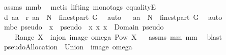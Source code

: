 \begin{isabellebody}
\ assms\ mm{}{}b\ \isamarkupfalse%
\ {\isacharparenleft}metis\ {\isacharparenleft}lifting{\isacharcomma}\ mono{\isacharunderscore}tags{\isacharparenright}\ equalityE{\isacharparenright}\isanewline
{}\isamarkupfalse%
\ \isamarkupfalse%
\ {\isachardoublequoteopen}{\isacharquery}d\ {\isacharquery}aa\ {\isasymtimes}\ {\isacharparenleft}{\isacharquery}r\ {\isacharquery}aa{\isacharparenright}\ {\isasymsubseteq}\ N\ {\isasymtimes}\ finestpart\ G{\isachardoublequoteclose}\ \isamarkupfalse%
\ auto\isanewline
{}\isamarkupfalse%
\ \isamarkupfalse%
\ {\isachardoublequoteopen}{\isacharquery}aa\ {\isasymsubseteq}\ N\ {\isasymtimes}\ finestpart\ G{\isachardoublequoteclose}\ \isamarkupfalse%
\ auto\isanewline
{}\isamarkupfalse%
%
\endisatagproof
{\isafoldproof}%
%
\isadelimproof
%
\endisadelimproof
\isanewline
\isanewline
\isanewline
\isanewline
\isanewline
\isanewline
\isanewline
\isanewline
\isanewline
\isanewline
\isanewline
\isanewline
\isanewline
\isanewline
\isanewline
\isanewline
\isanewline
\isanewline
\isanewline
\isanewline
\isanewline
\isanewline
\isanewline
\isanewline
\isanewline
\isanewline
\isanewline
\isanewline
\isanewline
\isanewline
\isanewline
\isanewline
\isanewline
\isanewline
\isanewline
{}\isamarkupfalse%
\ {\isachardoublequoteopen}mbc\ pseudo\ {\isacharequal}{\isacharequal}\ {\isacharbraceleft}{\isacharparenleft}x{\isacharcomma}\ {\isasymUnion}\ {\isacharparenleft}pseudo\ {\isacharbackquote}{\isacharbackquote}\ {\isacharbraceleft}x{\isacharbraceright}{\isacharparenright}{\isacharparenright}{\isacharbar}\ x{\isachardot}\ x\ {\isasymin}\ Domain\ pseudo{\isacharbraceright}{\isachardoublequoteclose}\isanewline
\ \isanewline
{}\isamarkupfalse%
\ \ {\isachardoublequoteopen}{\isacharbraceleft}{\isacharbraceright}\ {\isasymnotin}\ Range\ X{\isachardoublequoteclose}\ \ {\isachardoublequoteopen}inj{\isacharunderscore}on\ {\isacharparenleft}image\ omega{\isacharparenright}\ {\isacharparenleft}Pow\ X{\isacharparenright}{\isachardoublequoteclose}%
\isadelimproof
\ %
\endisadelimproof
%
\isatagproof
{}\isamarkupfalse%
\ assms\ mm{}{}\ mm{}{}\ \isamarkupfalse%
\ blast%
\endisatagproof
{\isafoldproof}%
%
\isadelimproof
%
\endisadelimproof
\isanewline
\isanewline
{}\isamarkupfalse%
\ {\isachardoublequoteopen}pseudoAllocation\ {\isacharequal}\ Union\ {\isasymcirc}\ {\isacharparenleft}image\ omega{\isacharparenright}{\isachardoublequoteclose}%

\end{isabellebody}
